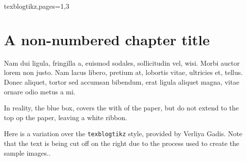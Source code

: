 \begin{showchapterstyle*}{texblogtikz,pages={1,3}}
\chapter*{A non-numbered chapter title}
Nam dui ligula, fringilla a, euismod sodales, sollicitudin vel,
wisi. Morbi auctor lorem non justo. Nam lacus libero, pretium at,
lobortis vitae, ultricies et, tellus. Donec aliquet, tortor sed
accumsan bibendum, erat ligula aliquet magna, vitae ornare odio metus
a mi.  


\end{showchapterstyle*}

In reality, the blue box, covers the with of the paper, but do not
extend to the top op the paper, leaving a white ribbon.


\starbreak

Here is a variation over the \texttt{texblogtikz} style, provided by
Verliya Gadis. Note that the text is being cut off on the right due to
the process used to create the sample images..

\begingroup


